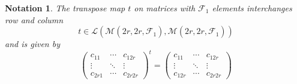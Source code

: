 \documentclass[aps,preprint]{revtex4}
\newtheorem{notation}[theorem]{Notation}
\begin{document}
\begin{notation}
The transpose map $t$ on matrices with $\mathcal{F}_{1}$ elements
interchanges row and column 
\begin{equation}
t\in \mathcal{L}\left( \mathcal{M}\left( \overset{}{2r,2r,\mathcal{F}_{1}}%
\right) ,\mathcal{M}\left( \overset{}{2r,2r,\mathcal{F}_{1}}\right) \right)
\end{equation}%
and is given by 
\begin{equation}
\left( 
\begin{array}{ccc}
c_{11} & \cdots & c_{12r} \\ 
\vdots & \ddots & \vdots \\ 
c_{2r1} & \cdots & c_{2r2r}%
\end{array}%
\right) ^{t}=\left( 
\begin{array}{ccc}
c_{11} & \cdots & c_{12r} \\ 
\vdots & \ddots & \vdots \\ 
c_{12r} & \cdots & c_{2r2r}%
\end{array}%
\right)
\end{equation}
\end{notation}
\end{document}
